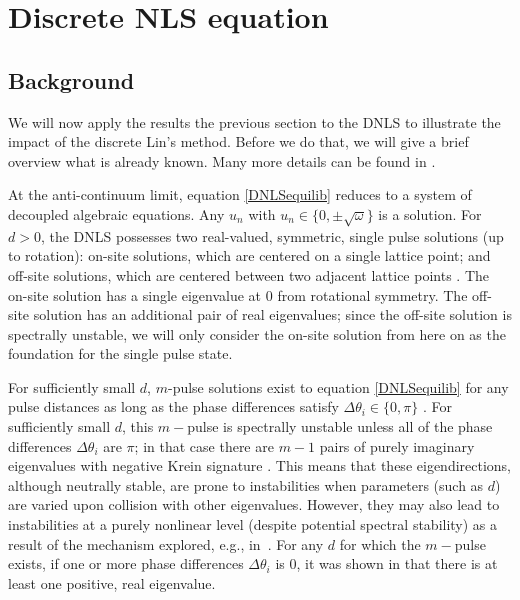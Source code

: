 \documentclass[12pt]{elsarticle}
\begin{document}
\section{Discrete NLS equation}\label{sec:DNLS}

\subsection{Background}

We will now apply the results the previous section to the DNLS to illustrate the impact of the discrete Lin's method. Before we do that, we will give a brief overview what is already known. Many more details can be found in \cite{Kevrekidis2009,pelinovsky_2011}. 

At the anti-continuum limit, equation \cref{DNLSequilib} reduces to a system of decoupled algebraic equations. Any $u_n$ with $u_n \in \{ 0, \pm \sqrt{\omega}\}$ is a solution. For $d > 0$, the DNLS possesses two real-valued, symmetric, single pulse solutions (up to rotation): on-site solutions, which are centered on a single lattice point; and off-site solutions, which are centered between two adjacent lattice points \cite{Kevrekidis2009}. The on-site solution has a single eigenvalue at 0 from rotational symmetry. The off-site solution has an additional pair of real eigenvalues; since the off-site solution is spectrally unstable, we will only consider the on-site solution from here on as the foundation for the single pulse state. 

For sufficiently small $d$, $m$-pulse solutions exist to equation \cref{DNLSequilib} for any pulse distances as long as the phase differences satisfy $\Delta \theta_i \in \{0, \pi\}$ \cite[Proposition 2.1]{Pelinovsky2005}. For sufficiently small $d$, this $m-$pulse is spectrally unstable unless all of the phase differences $\Delta \theta_i$ are $\pi$; in that case there are $m-1$ pairs of purely imaginary eigenvalues with negative Krein signature \cite[Theorem 3.6]{Pelinovsky2005}. This means that these eigendirections, although neutrally stable, are prone to instabilities when parameters (such as $d$) are varied upon collision with other eigenvalues. However, they may also lead to instabilities at a purely nonlinear level (despite potential spectral stability) as a result of the mechanism explored, e.g., in~\cite{CUCCAGNA200938,PRL_2015}. For any $d$ for which the $m-$pulse exists, if one or more phase differences $\Delta \theta_i$ is 0, it was shown in \cite{Kapitula2001a} that there is at least one positive, real eigenvalue.
\end{document}
